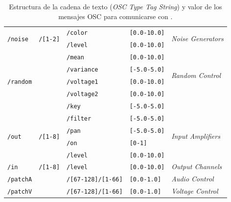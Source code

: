\begin{table}
\begin{center}
\begin{tabular}{ l c l l l }
			\hline
			\multirow{2}{*}{\texttt{/noise}}	& \multirow{2}{*}{\texttt{/[1-2]}}	& \texttt{/color}	&\texttt{[0.0-10.0]} & \multirow{2}{*}{\textit{Noise Generators}}\\
			& & \texttt{/level} &\texttt{[0.0-10.0]}& \\
			\hline
			
			\hline
			\multirow{5}{*}{\texttt{/random}}	& 	& \texttt{/mean}	&\texttt{[0.0-10.0]} \\
			& & \texttt{/variance} &\texttt{[-5.0-5.0]}&  \multirow{2}{*}{\textit{Random Control}}\\
			& & \texttt{/voltage1} &\texttt{[0.0-10.0]}& \multirow{2}{*}{\textit{Voltage Generator}}\\
			& & \texttt{/voltage2} &\texttt{[0.0-10.0]}& \\
			& & \texttt{/key} &\texttt{[-5.0-5.0]}& \\
			\hline
			
			\multirow{4}{*}{\texttt{/out}}	& \multirow{4}{*}{\texttt{/[1-8]}}	& \texttt{/filter}	&\texttt{[-5.0-5.0]} & \multirow{4}{*}{\textit{Input Amplifiers}}\\
			& & \texttt{/pan} & \texttt{[-5.0-5.0]} & \\
			& & \texttt{/on} & \texttt{[0-1]} & \\
			& & \texttt{/level} & \texttt{[0.0-10.0]} &\\
			\hline
			
			\multirow{1}{*}{\texttt{/in}}	& \multirow{1}{*}{\texttt{/[1-8]}}	& \texttt{/level}	&\texttt{[0.0-10.0]} & \multirow{1}{*}{\textit{Output Channels}}\\
			\hline
			
			\multirow{1}{*}{\texttt{/patchA}}	& 	
			& \texttt{/[67-128]/[1-66]} 	&\texttt{[0.0-1.0]} & \multirow{1}{*}{\textit{Audio Control}}\\
			\hline
			
			\multirow{1}{*}{\texttt{/patchV}}	& 	
			& \texttt{/[67-128]/[1-66]} 	&\texttt{[0.0-1.0]} & \multirow{1}{*}{\textit{Voltage Control}}\\
			\hline
			
		\end{tabular}
		\caption[Estructura de los mensajes OSC]{Estructura de la cadena de texto (\textit{OSC Type Tag String}) y valor de los mensajes OSC para comunicarse con \className.}
		\label{table:osc}
	\end{center}
\end{table}